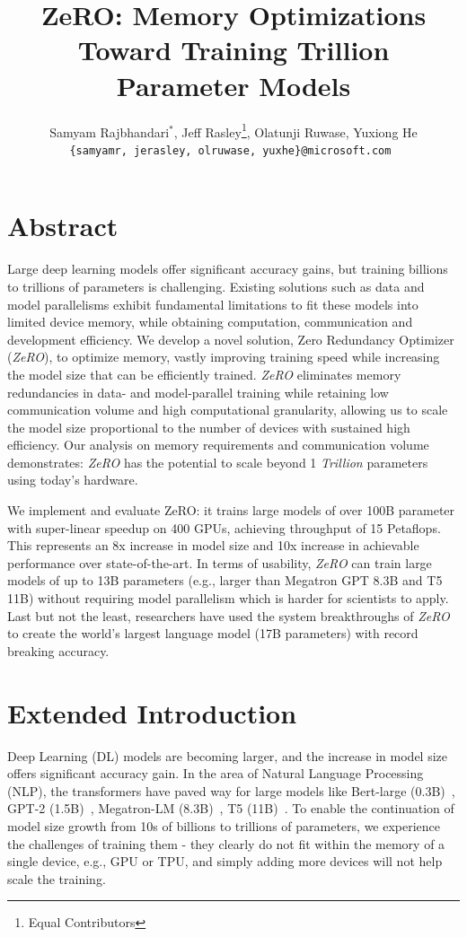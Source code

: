\documentclass{article}
\title{ZeRO: Memory Optimizations Toward Training Trillion Parameter Models}
\author{Samyam Rajbhandari$^*$, Jeff Rasley\footnote{Equal Contributors}, Olatunji Ruwase, Yuxiong He \\ \tt{\small \{samyamr, jerasley, olruwase, yuxhe\}@microsoft.com} }
\date{}
\newcommand{\name}{\emph{ZeRO}\xspace}
\begin{document}
\maketitle
\section*{Abstract}
Large deep learning models offer significant accuracy gains, but training billions to trillions of parameters is challenging. Existing solutions such as data and model parallelisms exhibit fundamental limitations to fit these models into limited device memory, while obtaining computation, communication and development efficiency.
We develop a novel solution, Zero Redundancy Optimizer (\name), to optimize memory, vastly improving training speed while increasing the model size that can be efficiently trained.  
\name eliminates memory redundancies in data- and model-parallel training while retaining low communication volume and high computational granularity, allowing us to scale the model size proportional to the number of devices with sustained high efficiency. Our analysis on memory requirements and communication volume demonstrates: \name has the potential to scale beyond 1 \emph{Trillion} parameters using today's hardware.

We implement and evaluate ZeRO: it trains large models of over 100B parameter with super-linear speedup on 400 GPUs, achieving throughput of 15 Petaflops. This represents an 8x increase in model size and 10x increase in achievable performance over state-of-the-art.  
In terms of usability, 
\name can train large models of up to 13B parameters (e.g., larger than Megatron GPT 8.3B and T5 11B) without requiring model parallelism which is harder for scientists to apply.
Last but not the least, researchers have used the system breakthroughs of \name to create the world's largest language model (17B parameters) with record breaking accuracy.

\section{Extended Introduction}
\label{sec:introduction}
Deep Learning (DL) models are becoming larger, and the increase in model size offers significant accuracy gain. In the area of Natural Language Processing (NLP), the transformers have paved way for large models like Bert-large (0.3B)~\cite{DBLP:journals/corr/bert}, GPT-2 (1.5B)~\cite{gpt-2}, Megatron-LM (8.3B)~\cite{megatronlm}, T5 (11B)~\cite{T5}. To enable the continuation of model size growth from 10s of billions to trillions of parameters, we experience the challenges of training them - they clearly do not fit within the memory of a single device, e.g., GPU or TPU, and simply adding more devices will not help scale the training.  
\end{document}
